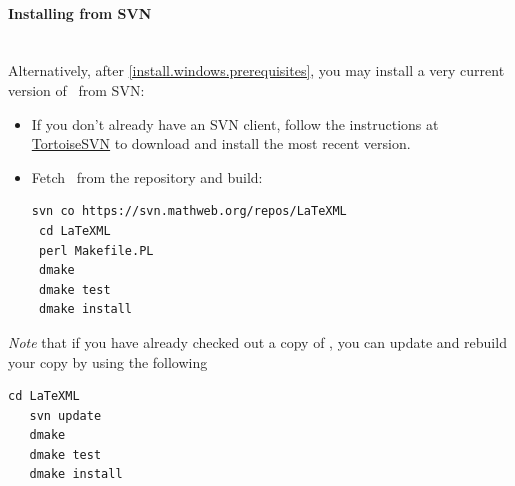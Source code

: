 \documentclass{article}
\begin{document}
\paragraph{Installing from SVN}\label{install.windows.svn}\\
Alternatively, after \ref{install.windows.prerequisites},
you may install a very current version of \LaTeXML\ from SVN:
\begin{itemize}
\item If you don't already have an SVN client,
   follow the instructions at \href{http://tortoisesvn.net/}{TortoiseSVN}
   to download and install the most recent version.
\item Fetch \LaTeXML\ from the repository and build:
\begin{lstlisting}[style=shell]
 svn co https://svn.mathweb.org/repos/LaTeXML
 cd LaTeXML
 perl Makefile.PL
 dmake
 dmake test
 dmake install
\end{lstlisting}
\end{itemize}

\emph{Note} that if you have already checked out a copy of \LaTeXML, you can update
and rebuild your copy by using the following
\begin{lstlisting}[style=shell]
   cd LaTeXML
   svn update
   dmake
   dmake test
   dmake install
\end{lstlisting}

\end{document}
